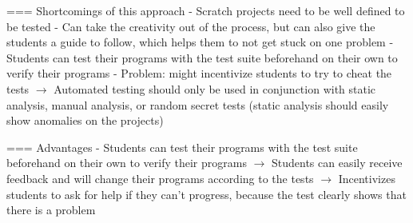 === Shortcomings of this approach
- Scratch projects need to be well defined to be tested
    - Can take the creativity out of the process, but can also give the students a guide to follow, which helps them to not get stuck on one problem
    - Students can test their programs with the test suite beforehand on their own to verify their programs
    - Problem: might incentivize students to try to cheat the tests
        $\rightarrow$ Automated testing should only be used in conjunction with static analysis, manual analysis, or random secret tests
        (static analysis should easily show anomalies on the projects)

=== Advantages
- Students can test their programs with the test suite beforehand on their own to verify their programs
    $\rightarrow$ Students can easily receive feedback and will change their programs according to the tests
    $\rightarrow$ Incentivizes students to ask for help if they can't progress, because the test clearly shows that there is a problem


